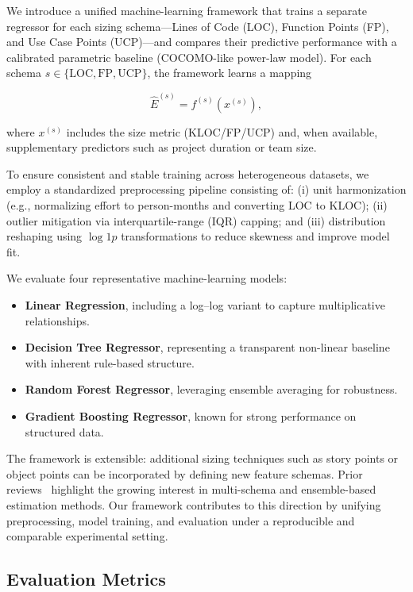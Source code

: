 \documentclass{ieeeaccess}
\begin{document}
We introduce a unified machine-learning framework that trains a separate regressor for each sizing schema—Lines of Code (LOC), Function Points (FP), and Use Case Points (UCP)—and compares their predictive performance with a calibrated parametric baseline (COCOMO-like power-law model). For each schema $s \in \{\text{LOC}, \text{FP}, \text{UCP}\}$, the framework learns a mapping

\begin{equation}
\hat{E}^{(s)} = f^{(s)}(x^{(s)}),
\end{equation}

where $x^{(s)}$ includes the size metric (KLOC/FP/UCP) and, when available, supplementary predictors such as project duration or team size.

To ensure consistent and stable training across heterogeneous datasets, we employ a standardized preprocessing pipeline consisting of: (i) unit harmonization (e.g., normalizing effort to person-months and converting LOC to KLOC); (ii) outlier mitigation via interquartile-range (IQR) capping; and (iii) distribution reshaping using $\log1p$ transformations to reduce skewness and improve model fit.

We evaluate four representative machine-learning models:
\begin{itemize}[leftmargin=1.3em]
    \item \textbf{Linear Regression}, including a log--log variant to capture multiplicative relationships.
    \item \textbf{Decision Tree Regressor}, representing a transparent non-linear baseline with inherent rule-based structure.
    \item \textbf{Random Forest Regressor}, leveraging ensemble averaging for robustness.
    \item \textbf{Gradient Boosting Regressor}, known for strong performance on structured data.
\end{itemize}

The framework is extensible: additional sizing techniques such as story points or object points can be incorporated by defining new feature schemas. Prior reviews~\cite{tanveer2023survey,azzeh2019cross} highlight the growing interest in multi-schema and ensemble-based estimation methods. Our framework contributes to this direction by unifying preprocessing, model training, and evaluation under a reproducible and comparable experimental setting.

\subsection{Evaluation Metrics}
\label{sec:evaluation-metrics}
\end{document}
